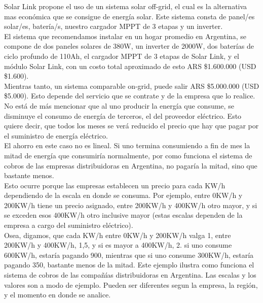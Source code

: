 Solar Link propone el uso de un sistema solar off-grid, el cual es la alternativa mas económica que se consigue de energía solar. Este sistema consta de panel/es solar/es, batería/s, nuestro cargador MPPT de 3 etapas y un inverter. \\

El sistema que recomendamos instalar en un hogar promedio en Argentina, se compone de dos paneles solares de 380W, un inverter de 2000W, dos baterías de ciclo profundo de 110Ah, el cargador MPPT de 3 etapas de Solar Link, y el módulo Solar Link, con un costo total aproximado de esto ARS \$1.600.000 (USD \$1.600).\\

Mientras tanto, un sistema comparable on-grid, puede salir ARS \$5.000.000 (USD \$5.000). Esto depende del servicio que se contrate y de la empresa que lo realice.\\

No está de más mencionar que al uno producir la energía  que consume, se disminuye el consumo de energía de terceros, el del proveedor eléctrico. Esto quiere decir, que todos los meses se verá reducido el precio que hay que pagar por el suministro de energía eléctrico.\\

El ahorro en este caso no es lineal. Si uno termina consumiendo a fin de mes la mitad de energía que consumiría normalmente, por como funciona el sistema de cobros de las empresas distribuidoras en Argentina, no pagaría la mitad, sino que bastante menos.\\

Esto ocurre porque las empresas establecen un precio para cada KW/h dependiendo de la escala en donde se consuma. Por ejemplo, entre 0KW/h y 200KW/h tiene un precio asignado, entre 200KW/h y 400KW/h otro mayor, y si se exceden esos 400KW/h otro inclusive mayor (estas escalas dependen de la empresa a cargo del suministro eléctrico).\\

Osea, digamos, que cada KW/h entre 0KW/h y 200KW/h valga 1, entre 200KW/h y 400KW/h, 1,5, y si es mayor a 400KW/h, 2. si uno consume 600KW/h, estaría pagando 900, mientras que si uno consume 300KW/h, estaría pagando 350, bastante menos de la mitad. Este ejemplo ilustra como funciona el sistema de cobros de las compañías distribuidoras en Argentina. Las escalas y los valores son a modo de ejemplo. Pueden ser diferentes segun la empresa, la región, y el momento en donde se analice.\\

